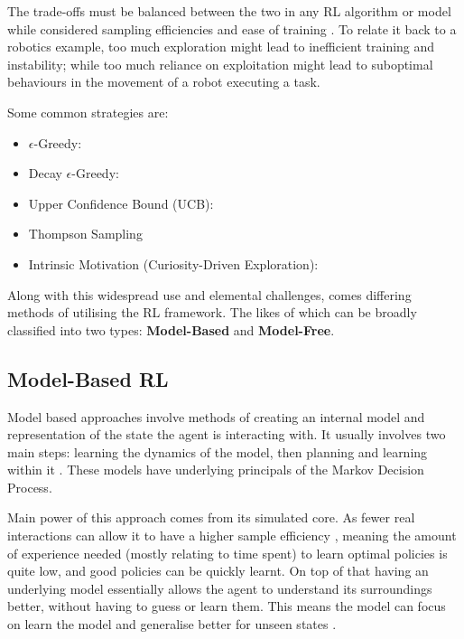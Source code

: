   The trade-offs must be balanced between the two in any RL algorithm or model while considered sampling efficiencies and ease of training \cite{liu2019simpleexplorationsampleefficient}. To relate it back to a robotics example, too much exploration might lead to inefficient training and instability; while too much reliance on exploitation might lead to suboptimal behaviours in the movement of a robot executing a task. 

  Some common strategies are:
  \begin{itemize}
    \item $\epsilon$-Greedy:
    \item Decay $\epsilon$-Greedy:
    \item Upper Confidence Bound (UCB):
    \item Thompson Sampling
    \item Intrinsic Motivation (Curiosity-Driven Exploration):
  \end{itemize}
  
  Along with this widespread use and elemental challenges, comes differing methods of utilising the RL framework. The likes of which can be broadly classified into two types: \textbf{Model-Based} and \textbf{Model-Free}.
  
  \subsection{Model-Based RL}
  Model based approaches involve methods of creating an internal model and representation of the state the agent is interacting with. It usually involves two main steps: learning the dynamics of the model, then planning and learning within it \cite{MAL-086}. These models have underlying principals of the Markov Decision Process.

  Main power of this approach comes from its simulated core. As fewer real interactions can allow it to have a higher sample efficiency \cite{liu2021DRLminireview,wu23robotLearn}, meaning the amount of experience needed (mostly relating to time spent) to learn optimal policies is quite low, and good policies can be quickly learnt.
  On top of that having an underlying model essentially allows the agent to understand its surroundings better, without having to guess or learn them. This means the model can focus on learn the model and generalise better for unseen states \cite{MAL-086}.
  
